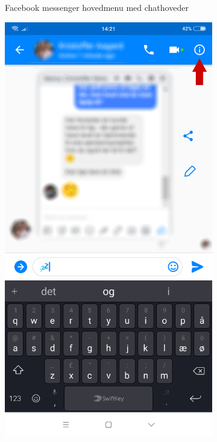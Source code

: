 \begin{figure}[H]
\begin{subfigure}{0.33\textwidth}
        \caption{Facebook messenger hovedmenu med chathoveder}
        \label{fig:facebookchat1}
    \end{subfigure}
    \begin{subfigure}{0.33\textwidth}
        \centering
        \includegraphics[scale=0.15]{Projectdoc/Problemanalyse/Illustrationer/2-fbchat.png}

\end{subfigure}
\end{figure}
